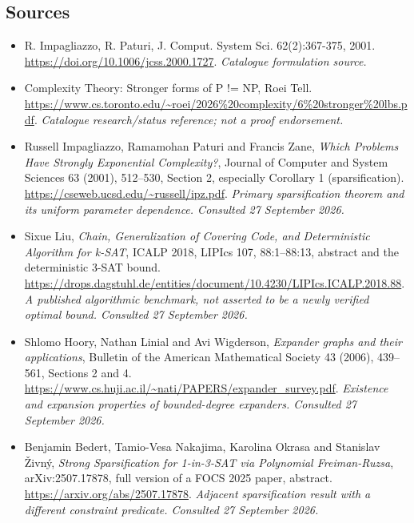 \documentclass[11pt,a4paper]{article}
\numberwithin{equation}{section}
\begin{document}
\subsection{Sources}
\begin{itemize}\raggedright
\item[\textnormal{[S1]}]\hypertarget{source:30006694:1}{} R. Impagliazzo, R. Paturi, J. Comput. System Sci. 62(2):367-375, 2001.
\url{https://doi.org/10.1006/jcss.2000.1727}.
{\small\textit{Catalogue formulation source.}}
\item[\textnormal{[S2]}]\hypertarget{source:30006694:2}{} Complexity Theory: Stronger forms of P != NP, Roei Tell.
\url{https://www.cs.toronto.edu/~roei/2026%20complexity/6%20stronger%20lbs.pdf}.
{\small\textit{Catalogue research/status reference; not a proof endorsement.}}
\item[\textnormal{[E1]}]\hypertarget{extra:30006694:1}{} Russell Impagliazzo, Ramamohan Paturi and Francis Zane,
\emph{Which Problems Have Strongly Exponential Complexity?}, Journal of Computer and System Sciences
63 (2001), 512--530, Section 2, especially Corollary 1 (sparsification).
\url{https://cseweb.ucsd.edu/~russell/ipz.pdf}.
{\small\textit{Primary sparsification theorem and its uniform parameter dependence. Consulted 27 September 2026.}}
\item[\textnormal{[E2]}]\hypertarget{extra:30006694:2}{} Sixue Liu,
\emph{Chain, Generalization of Covering Code, and Deterministic Algorithm for k-SAT},
ICALP 2018, LIPIcs 107, 88:1--88:13, abstract and the deterministic $3$-SAT bound.
\url{https://drops.dagstuhl.de/entities/document/10.4230/LIPIcs.ICALP.2018.88}.
{\small\textit{A published algorithmic benchmark, not asserted to be a newly verified optimal bound. Consulted 27 September 2026.}}
\item[\textnormal{[E3]}]\hypertarget{extra:30006694:3}{} Shlomo Hoory, Nathan Linial and Avi Wigderson,
\emph{Expander graphs and their applications}, Bulletin of the American Mathematical Society
43 (2006), 439--561, Sections 2 and 4.
\url{https://www.cs.huji.ac.il/~nati/PAPERS/expander_survey.pdf}.
{\small\textit{Existence and expansion properties of bounded-degree expanders. Consulted 27 September 2026.}}
\item[\textnormal{[E4]}]\hypertarget{extra:30006694:4}{} Benjamin Bedert, Tamio-Vesa Nakajima, Karolina Okrasa and Stanislav \v{Z}ivn\'y,
\emph{Strong Sparsification for 1-in-3-SAT via Polynomial Freiman-Ruzsa},
arXiv:2507.17878, full version of a FOCS 2025 paper, abstract.
\url{https://arxiv.org/abs/2507.17878}.
{\small\textit{Adjacent sparsification result with a different constraint predicate. Consulted 27 September 2026.}}
\end{itemize}
\end{document}
